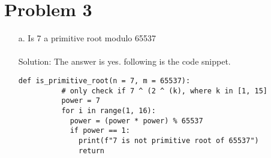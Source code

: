 \documentclass[12pt,letterpaper]{article}
\begin{document}
\section*{Problem 3}
\begin{enumerate}
    \item[a.]
      Is 7 a primitive root modulo 65537 \\ \\
      Solution: The answer is yes. following is the code snippet.
      \begin{lstlisting}[style = Python]
        def is_primitive_root(n = 7, m = 65537):
          # only check if 7 ^ (2 ^ (k), where k in [1, 15]
          power = 7 
          for i in range(1, 16):
            power = (power * power) % 65537
            if power == 1:
              print(f"7 is not primitive root of 65537")
              return


\end{lstlisting}
\end{enumerate}
\end{document}
